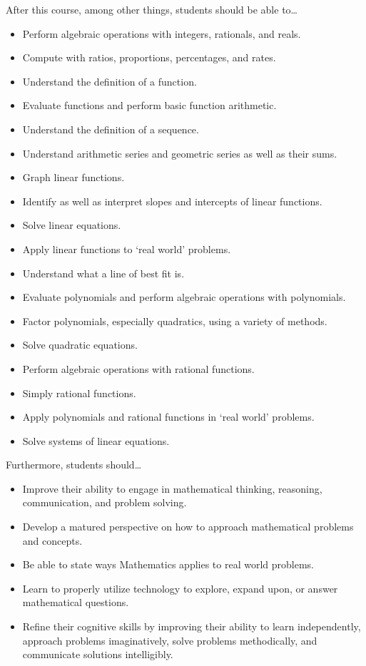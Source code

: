 \documentclass[11pt,letterpaper]{article}
\begin{document}
After this course, among other things, students should be able to\dots
	\begin{itemize} \itemsep=0.3ex
	\item Perform algebraic operations with integers, rationals, and reals. 
	\item Compute with ratios, proportions, percentages, and rates. 
	\item Understand the definition of a function.
	\item Evaluate functions and perform basic function arithmetic. 
	\item Understand the definition of a sequence. 
	\item Understand arithmetic series and geometric series as well as their sums.
	\item Graph linear functions. 
	\item Identify as well as interpret slopes and intercepts of linear functions.
	\item Solve linear equations. 
	\item Apply linear functions to `real world' problems.  
	\item Understand what a line of best fit is. 
	\item Evaluate polynomials and perform algebraic operations with polynomials.
	\item Factor polynomials, especially quadratics, using a variety of methods.
	\item Solve quadratic equations.
	\item Perform algebraic operations with rational functions. 
	\item Simply rational functions. 
	\item Apply polynomials and rational functions in `real world' problems.
	\item Solve systems of linear equations. 
	\end{itemize}
Furthermore, students should\dots
	\begin{itemize} \itemsep=0.3ex
	\item  Improve their ability to engage in mathematical thinking, reasoning, communication, and problem solving.
	\item Develop a matured perspective on how to approach mathematical problems and concepts.
	\item Be able to state ways Mathematics applies to real world problems.
	\item Learn to properly utilize technology to explore, expand upon, or answer mathematical questions.
	\item Refine their cognitive skills by improving their ability to learn independently, approach problems imaginatively, solve problems methodically, and communicate solutions intelligibly.
	\end{itemize}
\sectionbreak
\end{document}
